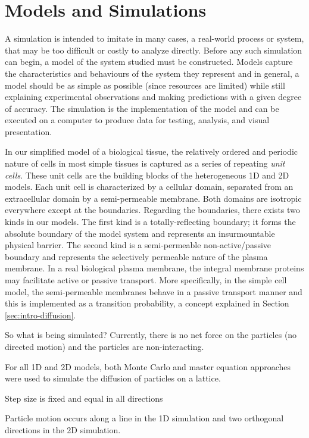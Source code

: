 \chapter{Models and Simulations}

A simulation is intended to imitate in many cases, a real-world process or system, that may be too difficult or costly to analyze directly. Before any such simulation can begin, a model of the system studied must be constructed. Models capture the characteristics and behaviours of the system they represent and in general, a model should be as simple as possible (since resources are limited) while still explaining experimental observations and making predictions with a given degree of accuracy. The simulation is the implementation of the model and can be executed on a computer to produce data for testing, analysis, and visual presentation.

In our simplified model of a biological tissue, the relatively ordered and periodic nature of cells in most simple tissues is captured as a series of repeating \textit{unit cells}. These unit cells are the building blocks of the heterogeneous 1D and 2D models. Each unit cell is characterized by a cellular domain, separated from an extracellular domain by a semi-permeable membrane. Both domains are isotropic everywhere except at the boundaries. Regarding the boundaries, there exists two kinds in our models. The first kind is a totally-reflecting boundary; it forms the absolute boundary of the model system and represents an insurmountable physical barrier. The second kind is a semi-permeable non-active/passive boundary and represents the selectively permeable nature of the plasma membrane. In a real biological plasma membrane, the integral membrane proteins may facilitate active or passive transport. More specifically, in the simple cell model, the semi-permeable membranes behave in a passive transport manner and this is implemented as a transition probability, a concept explained in Section \ref{sec:intro-diffusion}.

So what is being simulated? 
Currently, there is no net force on the particles (no directed motion) and the particles are non-interacting.

For all 1D and 2D models, both Monte Carlo and master equation approaches were used to simulate the diffusion of particles on a lattice.

Step size is fixed and equal in all directions

Particle motion occurs along a line in the 1D simulation and two orthogonal directions in the 2D simulation.


